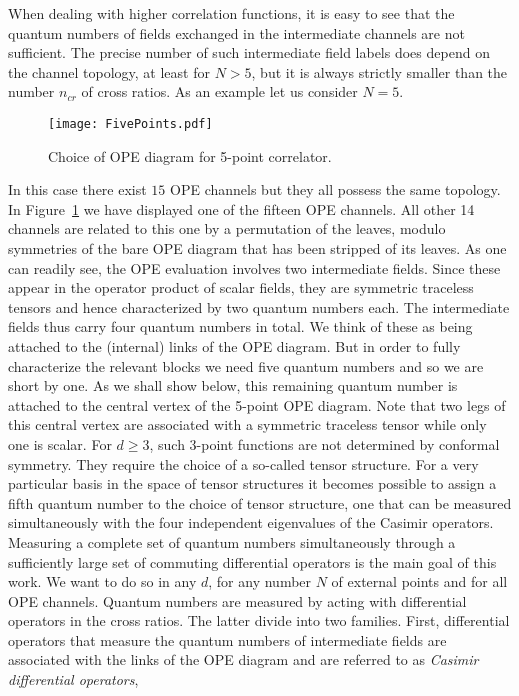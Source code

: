 \documentclass{article}
\begin{document}
When dealing with higher correlation functions, it is easy to see that the quantum numbers of fields exchanged in the intermediate channels are not sufficient. The precise number of such intermediate field labels does depend on the channel topology,
at least for $N > 5$, but it is always strictly smaller than the number $n_\textit{cr}$ 
of cross ratios. As an example let us consider $N=5$. 
\begin{figure}[thb]
\centering
\texttt{[image: FivePoints.pdf]}
\caption{Choice of OPE diagram for 5-point correlator.}
\label{fig:FivePointsOPE}
\end{figure}
In this case there exist $15$ 
OPE channels but they all possess the same topology. In Figure~\ref{fig:FivePointsOPE} we have displayed 
one of the fifteen OPE channels. All other 14 channels are related to this one by 
a permutation of the leaves, modulo symmetries of the bare OPE diagram that has 
been stripped of its leaves. As one can readily see, the OPE evaluation involves two 
intermediate fields. Since these appear in the operator product of scalar fields, they 
are symmetric traceless tensors and hence characterized by two quantum numbers each. 
The intermediate fields thus carry four quantum numbers in total. We think of these 
as being attached to the (internal) links of the OPE diagram. But in order to fully 
characterize the relevant blocks we need five quantum numbers and so we are short by 
one. As we shall show below, this remaining quantum number is attached to the central 
vertex of the 5-point OPE diagram. Note that two legs of this central vertex are 
associated with a symmetric traceless tensor while only one is scalar. For $d\geq 3$, 
such 3-point functions are not determined by conformal symmetry. They require the 
choice of a so-called tensor structure. For a very particular basis in the space of 
tensor structures it becomes possible to assign a fifth quantum number to the 
choice of tensor structure, one that can be measured simultaneously with the 
four independent eigenvalues of the Casimir operators. Measuring a complete 
set of quantum numbers simultaneously through a sufficiently large set of 
commuting differential operators is the main goal of this work. We want to 
do so in any $d$, for any number $N$ of external points and for all OPE channels. 
Quantum numbers are measured by acting with differential operators in the cross 
ratios. The latter divide into two families. First, differential operators that measure 
the quantum numbers of intermediate fields are associated with the 
links of the OPE diagram and are referred to as \textit{Casimir differential operators},
\end{document}
